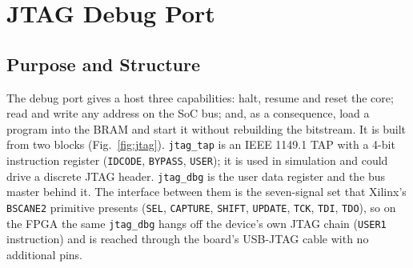 \documentclass[journal,10pt]{IEEEtran}
\newcommand{\reg}[1]{\texttt{#1}}
\begin{document}
\section{JTAG Debug Port}\label{sec:jtag}
\subsection{Purpose and Structure}
The debug port gives a host three capabilities: halt, resume and reset the
core; read and write any address on the SoC bus; and, as a consequence, load
a program into the BRAM and start it without rebuilding the bitstream. It is
built from two blocks (Fig.~\ref{fig:jtag}). \reg{jtag\_tap} is an IEEE
1149.1 TAP with a 4-bit instruction register (\reg{IDCODE}, \reg{BYPASS},
\reg{USER}); it is used in simulation and could drive a discrete JTAG header.
\reg{jtag\_dbg} is the user data register and the bus master behind it. The
interface between them is the seven-signal set that Xilinx's \reg{BSCANE2}
primitive presents (\reg{SEL}, \reg{CAPTURE}, \reg{SHIFT}, \reg{UPDATE},
\reg{TCK}, \reg{TDI}, \reg{TDO}), so on the FPGA the same \reg{jtag\_dbg}
hangs off the device's own JTAG chain (\reg{USER1} instruction) and is
reached through the board's USB-JTAG cable with no additional pins.
\end{document}
